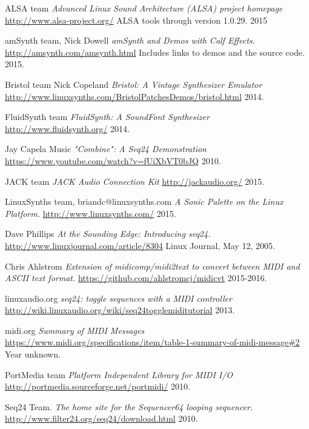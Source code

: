 \begin{thebibliography}{99}

   ALSA team
   \emph{Advanced Linux Sound Architecture (ALSA) project homepage}
   \url{http://www.alsa-project.org/}
   ALSA tools through version 1.0.29.
   2015

   amSynth team, Nick Dowell
   \emph{amSynth and Demos with Calf Effects.}
   \url{http://amsynth.com/amsynth.html}
   Includes links to demos and the source code.
   2015.

   Bristol team Nick Copeland
   \emph{Bristol: A Vintage Synthesizer Emulator}
   \url{http://www.linuxsynths.com/BristolPatchesDemos/bristol.html}
   2014.

   FluidSynth team
   \emph{FluidSynth: A SoundFont Synthesizer}
   \url{http://www.fluidsynth.org/}
   2014.

   Jay Capela Music
   \emph{"Combine": A Seq24 Demonstration}
   \url{https://www.youtube.com/watch?v=fUiXbVT0bJQ}
   2010.

   JACK team
   \emph{JACK Audio Connection Kit}
   \url{http://jackaudio.org/}
   2015.

   LinuxSynths team, briandc@linuxsynths.com
   \emph{A Sonic Palette on the Linux Platform.}
   \url{http://www.linuxsynths.com/}
   2015.

   Dave Phillips
   \emph{At the Sounding Edge: Introducing seq24.}
   \url{http://www.linuxjournal.com/article/8304}
   Linux Journal, May 12, 2005.

   Chris Ahlstrom
   \emph{Extension of midicomp/midi2text to convert between MIDI and ASCII
      text format.}
   \url{https://github.com/ahlstromcj/midicvt}
   2015-2016.

   linuxaudio.org
   \emph{seq24: toggle sequences with a MIDI controller}
   \url{http://wiki.linuxaudio.org/wiki/seq24togglemiditutorial}
   2013.

   midi.org
   \emph{Summary of MIDI Messages}
   \url{https://www.midi.org/specifications/item/table-1-summary-of-midi-message#2}
   Year unknown.

   PortMedia team
   \emph{Platform Independent Library for MIDI I/O}
   \url{http://portmedia.sourceforge.net/portmidi/}
   2010.

   Seq24 Team.
   \emph{The home site for the Sequencer64 looping sequencer.}
   \url{http://www.filter24.org/seq24/download.html}
   2010.


\end{thebibliography}
